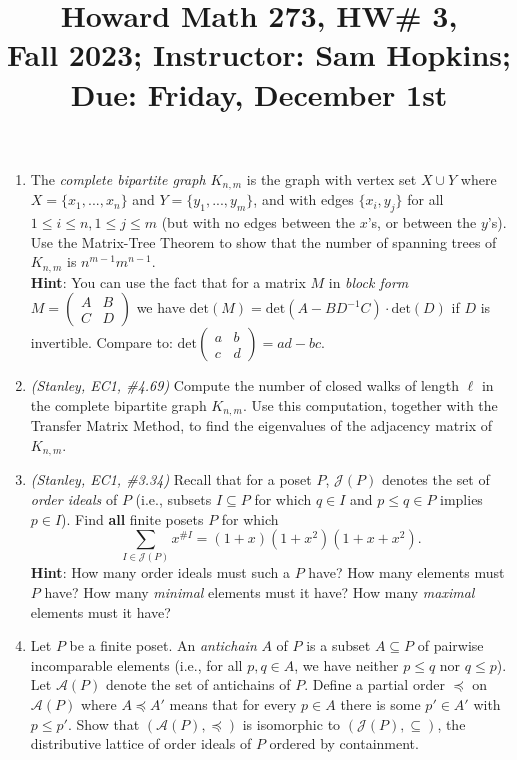 \documentclass[11pt]{article}
\title{Howard Math 273, HW\# 3, \\ {\normalsize Fall 2023; Instructor: Sam Hopkins; Due: Friday, December 1st}}
\date{}
\begin{document}
\maketitle

\thispagestyle{empty}

\vspace{-1cm}

\begin{enumerate}

\item The \emph{complete bipartite graph $K_{n,m}$} is the graph with vertex set $X\cup Y$ where $X=\{x_1,...,x_n\}$ and $Y=\{y_1,...,y_m\}$, and with edges $\{x_i,y_j\}$ for all $1\leq i \leq n, 1\leq j \leq m$ (but with no edges between the $x$'s, or between the $y$'s). Use the Matrix-Tree Theorem to show that the number of spanning trees of $K_{n,m}$ is $n^{m-1}m^{n-1}$. \\
{\bf Hint}: You can use the fact that for a matrix $M$ in \emph{block form} $M=\begin{pmatrix} A & B \\ C & D \end{pmatrix}$ we have $\mathrm{det}(M) = \mathrm{det}(A-BD^{-1}C)\cdot\mathrm{det}(D)$ if $D$ is invertible. Compare to: $\mathrm{det}\begin{pmatrix} a & b \\ c & d\end{pmatrix}=ad-bc$.

\item  \emph{(Stanley, EC1, \#4.69)} Compute the number of closed walks of length $\ell$ in the complete bipartite graph $K_{n,m}$. Use this computation, together with the Transfer Matrix Method, to find the eigenvalues of the adjacency matrix of $K_{n,m}$.

\item \emph{(Stanley, EC1, \#3.34)} Recall that for a poset $P$, $\mathcal{J}(P)$ denotes the set of \emph{order ideals} of $P$ (i.e., subsets $I\subseteq P$ for which $q\in I$ and $p\leq q\in P$ implies $p\in I$). Find {\bf all} finite posets $P$ for which
\[ \sum_{I \in \mathcal{J}(P)} x^{\#I} = (1+x)(1+x^2)(1+x+x^2).\]
{\bf Hint}: How many order ideals must such a $P$ have? How many elements must $P$ have? How many \emph{minimal} elements must it have? How many \emph{maximal} elements must it have?

\item Let $P$ be a finite poset. An \emph{antichain} $A$ of $P$ is a subset $A\subseteq P$ of pairwise incomparable elements (i.e., for all $p,q\in A$, we have neither $p\leq q$ nor $q \leq p$). Let $\mathcal{A}(P)$ denote the set of antichains of $P$. Define a partial order $\preceq$ on $\mathcal{A}(P)$ where $A \preceq A'$ means that for every $p \in A$ there is some $p'\in A'$ with $p \leq p'$. Show that $(\mathcal{A}(P),\preceq)$ is isomorphic to $(\mathcal{J}(P),\subseteq)$, the distributive lattice of order ideals of $P$ ordered by containment.


\end{enumerate}
\end{document}
